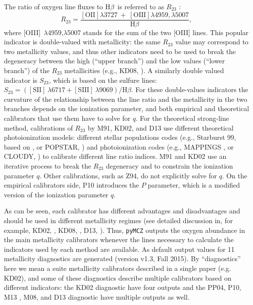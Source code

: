 \documentclass{emulateapj} \usepackage{amsmath} \usepackage{float}
\newcommand{\hb}{\ensuremath{\mathrm{H}\beta}}
\begin{document}
The ratio of oxygen line fluxes to \hb~is referred to as $R_{23}$
\citep{pagel79}:
$$R_{23}=\frac{\mathrm{[OII]} \lambda 3727~+~\mathrm{[OIII]} \lambda
  4959,\lambda 5007}{\hb},$$ where [OIII]~$\lambda$4959,$\lambda$5007
stands for the sum of the two [OIII] lines.  This popular indicator is
double-valued with metallicity: the same $R_{23}$ value may correspond
to two metallicity values, and thus other indicators need to be used
to break the degeneracy between the high (``upper branch'') and
the low values (``lower branch'') of the $R_{23}$ metallicities (e.g.,
KD08, \citealt{moustakas10}). A similarly double valued
indicator is $S_{23}$, which is based on the sulfure lines: 
$ S_{23}=( \mathrm{[SII]}~\lambda6717+\mathrm{[SIII]}~\lambda9069) / \hb $. 
For these double-values indicators the curvature of the
relationship between the line ratio and the metallicity in the two
branches depends on the ionization parameter, and both empirical and
theoretical calibrators that use them have to solve for $q$.  For the
theoretical strong-line method, calibrations of $R_{23}$ by M91, KD02,
and D13 use different theoretical photoionization models: different
stellar populations codes (e.g., Starburst 99, based on \citealt{bruzual93},
or POPSTAR, \citealt{molla09}) and photoionization codes (e.g., MAPPINGS \citealt{allen08}, or CLOUDY, \citealt{ferland98}) to
calibrate different line ratio indices.  M91 and KD02 use an iterative
process to break the $R_{23}$ degeneracy and to constrain the
ionization parameter $q$. Other calibrations, such as Z94, do not
explicitly solve for $q$.  On the empirical calibrators side, P10
introduces the $P$ parameter, which is a modified version of the
ionization parameter $q$.

As can be seen, each calibrator has different advantages and
disadvantages and should be used in different metallicity regimes (see
detailed discussion in, for example,
KD02, \citealt{stasinska02}, KD08, \citealt{moustakas10,lopezsanchez12}, D13, \citealt{blanc15}). Thus,
\verb=pyMCZ= outputs the oxygen abundance in the main metallicity
calibrators whenever the lines necessary to calculate the indicators
used by each method are available. As default output values for 11
metallicity diagnostics are generated (version v1.3, Fall 2015). By
``diagnostics'' here we mean a suite metallicity calibrators described in a
single paper (e.g. KD02), and some of these diagnostics describe
multiple calibrators based on different indicators: the KD02
diagnostic have four outputs and the PP04, P10, M13 , M08, and D13
diagnostic have multiple outputs as well.
\end{document}
